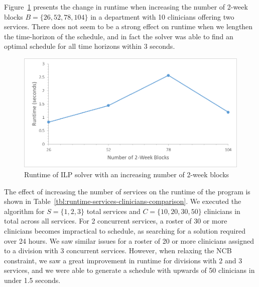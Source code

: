 Figure~\ref{fig:runtime-blocks} presents the change in runtime when increasing
the number of 2-week blocks $B = \{26, 52, 78, 104\}$ in a department with 10
clinicians offering two services. There does not seem to be a strong effect on
runtime when we lengthen the time-horizon of the schedule, and in fact the
solver was able to find an optimal schedule for all time horizons within 3
seconds. %

\begin{figure}[h]
	\centering
	\includegraphics[scale=.5]{fig/runtime_blocks}
	\caption{Runtime of ILP solver with an increasing number of 2-week blocks}%
  \label{fig:runtime-blocks}
\end{figure}

The effect of increasing the number of services %
on the runtime of the program is shown in Table~\ref{tbl:runtime-services-clinicians-comparison}.
We executed the algorithm for
$S = \{1, 2, 3\}$ total services and $C = \{10, 20, 30, 50\}$ clinicians in
total across all services. For 2 concurrent services, a roster of 30 or more
clinicians becomes impractical to schedule, as searching for a solution required
over 24 hours. We saw similar issues for a roster of 20 or more clinicians
assigned to a division with 3 concurrent services. However, when relaxing the
NCB constraint, we saw a great improvement in runtime for divisions with 2 and 3
services, and we were able to generate a schedule with upwards of 50 clinicians
in under 1.5 seconds.  %


